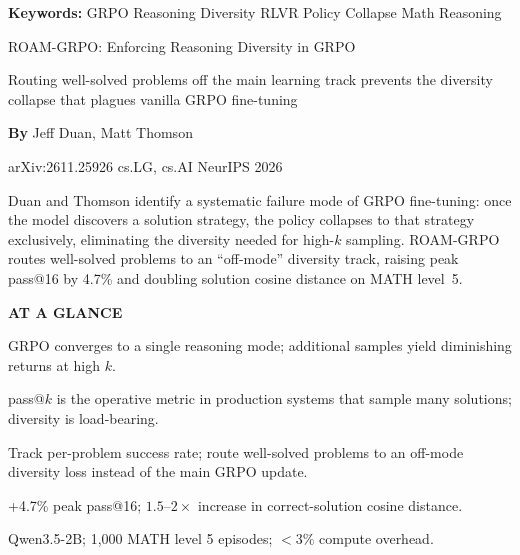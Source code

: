 \documentclass[10pt,twocolumn]{article}
\begin{document}
\setlength{\parindent}{0pt}
\setlength{\parskip}{4pt}

{\small\color{keywordgray}\textbf{Keywords:}
  GRPO \textbullet{} Reasoning Diversity \textbullet{} RLVR \textbullet{} Policy Collapse \textbullet{} Math Reasoning}\par\vspace{4pt}

{\LARGE\bfseries\raggedright ROAM-GRPO: Enforcing Reasoning Diversity in GRPO}\par\vspace{4pt}
{\large\itshape\raggedright Routing well-solved problems off the main learning track prevents the diversity collapse that plagues vanilla GRPO fine-tuning}\par\vspace{6pt}
{\small\textbf{By} Jeff Duan, Matt Thomson}\par\vspace{2pt}
{\small\color{keywordgray}arXiv:2611.25926 \textbullet{} cs.LG, cs.AI \textbullet{} NeurIPS 2026}
\par\vspace{2pt}\noindent{\color{rulered}\rule{\columnwidth}{0.6pt}}\vspace{6pt}

Duan and Thomson identify a systematic failure mode of GRPO fine-tuning: once the model discovers a solution strategy, the policy collapses to that strategy exclusively, eliminating the diversity needed for high-$k$ sampling.
ROAM-GRPO routes well-solved problems to an ``off-mode'' diversity track, raising peak pass@16 by 4.7\% and doubling solution cosine distance on MATH level~5.

\begin{mdframed}[backgroundcolor=boxgray,linecolor=rulered,linewidth=1pt,
    innerleftmargin=6pt,innerrightmargin=6pt,
    innertopmargin=6pt,innerbottommargin=6pt]
\textbf{\small AT A GLANCE}\par\vspace{4pt}
\begin{description}[leftmargin=0pt,labelsep=4pt,itemsep=2pt,parsep=0pt,
    font=\small\bfseries]
  \item[Problem:] GRPO converges to a single reasoning mode; additional samples yield diminishing returns at high $k$.
  \item[Why it matters:] pass@$k$ is the operative metric in production systems that sample many solutions; diversity is load-bearing.
  \item[Method:] Track per-problem success rate; route well-solved problems to an off-mode diversity loss instead of the main GRPO update.
  \item[Result:] +4.7\% peak pass@16; $1.5\text{--}2\times$ increase in correct-solution cosine distance.
  \item[Evidence:] Qwen3.5-2B; 1,000 MATH level 5 episodes; $<3\%$ compute overhead.
\end{description}
\end{mdframed}
\end{document}
